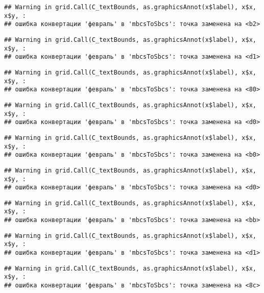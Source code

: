 \documentclass[
]{article}
\begin{document}
\begin{verbatim}
## Warning in grid.Call(C_textBounds, as.graphicsAnnot(x$label), x$x, x$y, :
## ошибка конвертации 'февраль' в 'mbcsToSbcs': точка заменена на <b2>
\end{verbatim}

\begin{verbatim}
## Warning in grid.Call(C_textBounds, as.graphicsAnnot(x$label), x$x, x$y, :
## ошибка конвертации 'февраль' в 'mbcsToSbcs': точка заменена на <d1>
\end{verbatim}

\begin{verbatim}
## Warning in grid.Call(C_textBounds, as.graphicsAnnot(x$label), x$x, x$y, :
## ошибка конвертации 'февраль' в 'mbcsToSbcs': точка заменена на <80>
\end{verbatim}

\begin{verbatim}
## Warning in grid.Call(C_textBounds, as.graphicsAnnot(x$label), x$x, x$y, :
## ошибка конвертации 'февраль' в 'mbcsToSbcs': точка заменена на <d0>
\end{verbatim}

\begin{verbatim}
## Warning in grid.Call(C_textBounds, as.graphicsAnnot(x$label), x$x, x$y, :
## ошибка конвертации 'февраль' в 'mbcsToSbcs': точка заменена на <b0>
\end{verbatim}

\begin{verbatim}
## Warning in grid.Call(C_textBounds, as.graphicsAnnot(x$label), x$x, x$y, :
## ошибка конвертации 'февраль' в 'mbcsToSbcs': точка заменена на <d0>
\end{verbatim}

\begin{verbatim}
## Warning in grid.Call(C_textBounds, as.graphicsAnnot(x$label), x$x, x$y, :
## ошибка конвертации 'февраль' в 'mbcsToSbcs': точка заменена на <bb>
\end{verbatim}

\begin{verbatim}
## Warning in grid.Call(C_textBounds, as.graphicsAnnot(x$label), x$x, x$y, :
## ошибка конвертации 'февраль' в 'mbcsToSbcs': точка заменена на <d1>
\end{verbatim}

\begin{verbatim}
## Warning in grid.Call(C_textBounds, as.graphicsAnnot(x$label), x$x, x$y, :
## ошибка конвертации 'февраль' в 'mbcsToSbcs': точка заменена на <8c>
\end{verbatim}
\end{document}
